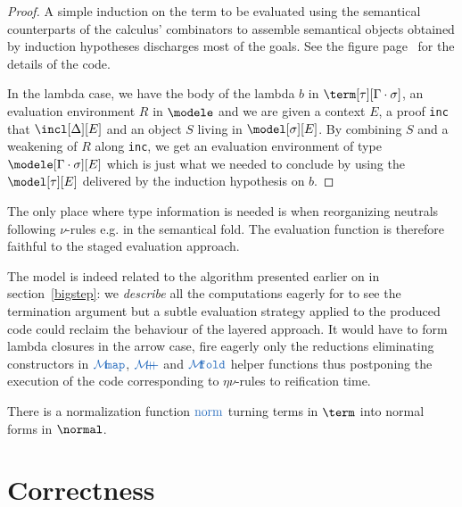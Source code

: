 \begin{proof}A simple induction on the term to be evaluated using the semantical
counterparts of the calculus' combinators to assemble semantical objects obtained
by induction hypotheses discharges most of the goals. See the figure page~\pageref{evalfun}
for the details of the code.

In the lambda case, we have the body of the lambda $b$ in $\term[\tau][\Gamma \cdot \sigma]$,
an evaluation environment $R$ in $\modele$ and we are given a context $E$, a proof
\texttt{inc} that $\incl[\Delta][E]$ and an object $S$ living in $\model[\sigma][E]$.
By combining $S$ and a weakening of $R$ along \texttt{inc}, we get an evaluation
environment of type $\modele[\Gamma \cdot \sigma][E]$ which is just what we needed
to conclude by using the $\model[\tau][E]$ delivered by the induction hypothesis
on $b$.
\end{proof}

\begin{remark}The only place where type information is needed is when reorganizing
neutrals following $\nu$-rules e.g. in the semantical fold. The evaluation function
is therefore faithful to the staged evaluation approach.

The model is indeed related to the algorithm presented earlier on in section~\ref{bigstep}:
we \emph{describe} all the computations eagerly for \agda{} to see the termination
argument but a subtle evaluation strategy applied to the produced code could reclaim
the behaviour of the layered approach. It would have to form lambda closures in
the arrow case, fire eagerly only the reductions eliminating constructors in
$\vmap$, $\vappend$ and $\vfold$ helper functions thus postponing the execution
of the code corresponding to $\eta\nu$-rules to reification time.
\end{remark}

\begin{corollary}There is a normalization function $\norm$ turning terms in
$\term$ into normal forms in $\normal$.
\end{corollary}








\section{Correctness}

